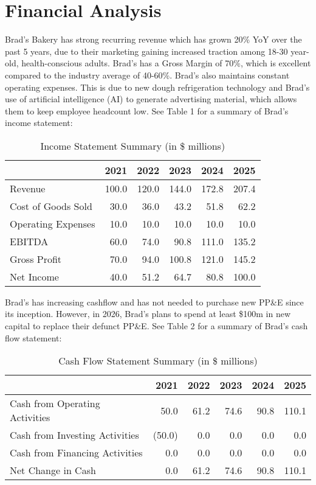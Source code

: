 \documentclass[11pt]{article}
\begin{document}
\section{Financial Analysis}
    Brad's Bakery has strong recurring revenue which has grown 20\% YoY over the past 5 years, due to their marketing gaining increased traction among 18-30 year-old, health-conscious adults. Brad's has a Gross Margin of 70\%, which is excellent compared to the industry average of 40-60\%. Brad's also maintains constant operating expenses. This is due to new dough refrigeration technology and Brad's use of artificial intelligence (AI) to generate advertising material, which allows them to keep employee headcount low. See Table 1 for a summary of Brad's income statement:
    \begin{table}[H]
        \centering
        \caption{Income Statement Summary (in \$ millions)}
        \begin{tabular}{lrrrrr}
            \toprule
            & 2021 & 2022 & 2023 & 2024 & 2025 \\
            \midrule
            Revenue                  & 100.0 & 120.0 & 144.0 & 172.8 & 207.4 \\
            Cost of Goods Sold       & 30.0 & 36.0 & 43.2 & 51.8 & 62.2 \\
            Operating Expenses       & 10.0 & 10.0 & 10.0 & 10.0 & 10.0 \\
            EBITDA                   & 60.0 & 74.0 & 90.8 & 111.0 & 135.2 \\
            \addlinespace 
            Gross Profit             & 70.0 & 94.0 & 100.8 & 121.0 & 145.2 \\ 
            Net Income               & 40.0 & 51.2 & 64.7 & 80.8 & 100.0 \\
            \bottomrule
        \end{tabular}
    \end{table}
    Brad's has increasing cashflow and has not needed to purchase new PP\&E since its inception. However, in 2026, Brad's plans to spend at least \$100m in new capital to replace their defunct PP\&E. See Table 2 for a summary of Brad's cash flow statement:
    \begin{table}[H]
        \centering
        \caption{Cash Flow Statement Summary (in \$ millions)}
        \begin{tabular}{lrrrrr}
            \toprule
            & 2021 & 2022 & 2023 & 2024 & 2025 \\
            \midrule
            Cash from Operating Activities & 50.0 & 61.2 & 74.6 & 90.8 & 110.1 \\
            Cash from Investing Activities & (50.0) & 0.0 & 0.0 & 0.0 & 0.0 \\
            Cash from Financing Activities & 0.0 & 0.0 & 0.0 & 0.0 & 0.0 \\
            \addlinespace
            Net Change in Cash            & 0.0 & 61.2 & 74.6 & 90.8 & 110.1 \\
            \bottomrule
        \end{tabular}
    \end{table}
\end{document}
